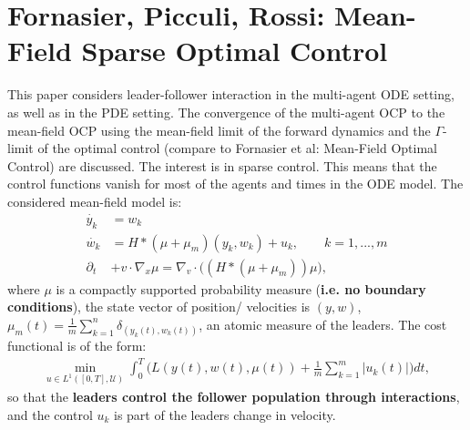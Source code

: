 \documentclass[11pt, a4paper]{article}
\theoremstyle{definition}
\begin{document}
\section{Fornasier, Picculi, Rossi: Mean-Field Sparse Optimal Control \cite{Fornasier_2014no2}}
This paper considers leader-follower interaction in the multi-agent ODE setting, as well as in the PDE setting. The convergence of the multi-agent OCP to the mean-field OCP using the mean-field limit of the forward dynamics and the $\Gamma$-limit of the optimal control (compare to Fornasier et al: Mean-Field Optimal Control) are discussed.
The interest is in sparse control. This means that the control functions vanish for most of the agents and times in the ODE model.
The considered mean-field model is:
\begin{align*}
\dot{y_k} &= w_k\\
\dot{w_k} &= H \ast (\mu + \mu_m) (y_k,w_k) + u_k, \qquad k=1,...,m\\
\partial_t &+ v \cdot \nabla_x \mu = \nabla_v \cdot \bigg( (H \ast (\mu + \mu_m))\mu\bigg),
\end{align*}
where $\mu$ is a compactly supported probability measure (\textbf{i.e. no boundary conditions}), the state vector of position/ velocities is $(y,w)$, $\mu_m(t) = \frac{1}{m}\sum_{k=1}^n \delta_{(y_k(t),w_k(t))}$, an atomic measure of the leaders.
The cost functional is of the form:
\begin{align*}
\min_{u \in L^1([0,T],\mathcal{U})} \int_0^T \bigg(L(y(t),w(t),\mu(t)) + \frac{1}{m}\sum_{k=1}^m |u_k(t)|\bigg)dt,
\end{align*} 
so that the \textbf{leaders control the follower population through interactions}, and the control $u_k$ is part of the leaders change in velocity.
\end{document}
